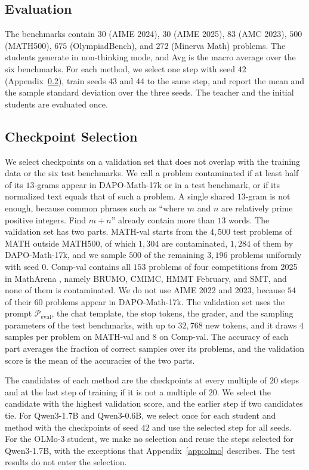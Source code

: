\subsection{Evaluation}

The benchmarks contain $30$ (AIME 2024), $30$ (AIME 2025), $83$ (AMC 2023),
$500$ (MATH500), $675$ (OlympiadBench), and $272$ (Minerva Math) problems.
The students generate in non-thinking mode, and Avg is the macro average over
the six benchmarks.
For each method, we select one step with seed $42$
(Appendix~\ref{app:selection}), train seeds $43$ and $44$ to the same step, and
report the mean and the sample standard deviation over the three seeds.
The teacher and the initial students are evaluated once.

\subsection{Checkpoint Selection}
\label{app:selection}

We select checkpoints on a validation set that does not overlap with the
training data or the six test benchmarks.
We call a problem contaminated if at least half of its $13$-grams appear in
DAPO-Math-17k or in a test benchmark, or if its normalized text equals that of
such a problem.
A single shared $13$-gram is not enough, because common phrases such as ``where
$m$ and $n$ are relatively prime positive integers. Find $m+n$'' already contain
more than $13$ words.
The validation set has two parts.
MATH-val starts from the $4{,}500$ test problems of MATH outside MATH500, of
which $1{,}304$ are contaminated, $1{,}284$ of them by DAPO-Math-17k, and we
sample $500$ of the remaining $3{,}196$ problems uniformly with seed $0$.
Comp-val contains all $153$ problems of four competitions from 2025 in MathArena
\citep{balunovic2025matharena}, namely BRUMO, CMIMC, HMMT February, and SMT, and
none of them is contaminated.
We do not use AIME 2022 and 2023, because $54$ of their $60$ problems appear in
DAPO-Math-17k.
The validation set uses the prompt $\mathcal{P}_{\text{eval}}$, the chat
template, the stop tokens, the grader, and the sampling parameters of the test
benchmarks, with up to $32{,}768$ new tokens, and it draws $4$ samples per
problem on MATH-val and $8$ on Comp-val.
The accuracy of each part averages the fraction of correct samples over its
problems, and the validation score is the mean of the accuracies of the two
parts.

The candidates of each method are the checkpoints at every multiple of $20$
steps and at the last step of training if it is not a multiple of $20$.
We select the candidate with the highest validation score, and the earlier step
if two candidates tie.
For Qwen3-1.7B and Qwen3-0.6B, we select once for each student and method with
the checkpoints of seed $42$ and use the selected step for all seeds.
For the OLMo-3 student, we make no selection and reuse the steps selected for
Qwen3-1.7B, with the exceptions that Appendix~\ref{app:olmo} describes.
The test results do not enter the selection.

